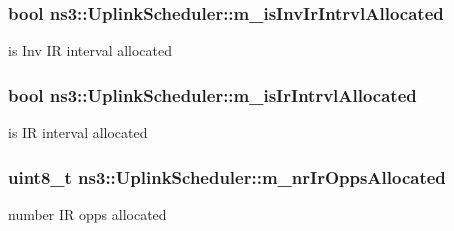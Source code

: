 \subsubsection[{\texorpdfstring{m\+\_\+is\+Inv\+Ir\+Intrvl\+Allocated}{m_isInvIrIntrvlAllocated}}]{\setlength{\rightskip}{0pt plus 5cm}bool ns3\+::\+Uplink\+Scheduler\+::m\+\_\+is\+Inv\+Ir\+Intrvl\+Allocated\hspace{0.3cm}{\ttfamily [private]}}\hypertarget{classns3_1_1UplinkScheduler_afe06da2181a94f478276407f38a8ebb0}{}\label{classns3_1_1UplinkScheduler_afe06da2181a94f478276407f38a8ebb0}


is Inv IR interval allocated 

\subsubsection[{\texorpdfstring{m\+\_\+is\+Ir\+Intrvl\+Allocated}{m_isIrIntrvlAllocated}}]{\setlength{\rightskip}{0pt plus 5cm}bool ns3\+::\+Uplink\+Scheduler\+::m\+\_\+is\+Ir\+Intrvl\+Allocated\hspace{0.3cm}{\ttfamily [private]}}\hypertarget{classns3_1_1UplinkScheduler_a8ed6c292568657340ff861fa0cc50a11}{}\label{classns3_1_1UplinkScheduler_a8ed6c292568657340ff861fa0cc50a11}


is IR interval allocated 

\subsubsection[{\texorpdfstring{m\+\_\+nr\+Ir\+Opps\+Allocated}{m_nrIrOppsAllocated}}]{\setlength{\rightskip}{0pt plus 5cm}uint8\+\_\+t ns3\+::\+Uplink\+Scheduler\+::m\+\_\+nr\+Ir\+Opps\+Allocated\hspace{0.3cm}{\ttfamily [private]}}\hypertarget{classns3_1_1UplinkScheduler_a9d30f3508fcdfbc881b4b8bb5979b7fc}{}\label{classns3_1_1UplinkScheduler_a9d30f3508fcdfbc881b4b8bb5979b7fc}


number IR opps allocated 

